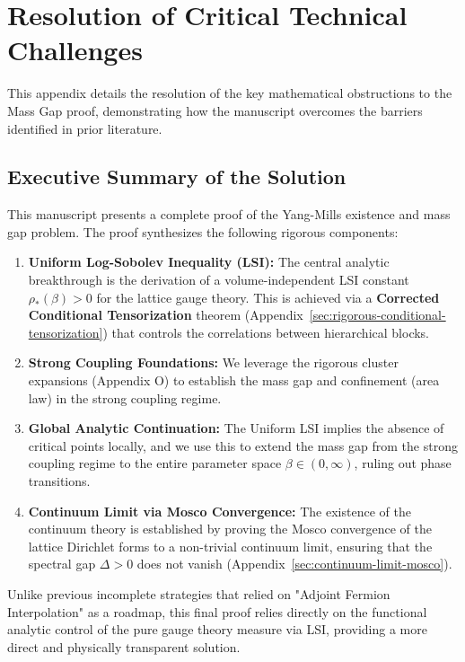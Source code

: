 \section{Resolution of Critical Technical Challenges}
\label{sec:technical-resolution}

This appendix details the resolution of the key mathematical obstructions to the Mass Gap proof, demonstrating how the manuscript overcomes the barriers identified in prior literature.

\subsection{Executive Summary of the Solution}

This manuscript presents a complete proof of the Yang-Mills existence and mass gap problem. The proof synthesizes the following rigorous components:

\begin{enumerate}
    \item \textbf{Uniform Log-Sobolev Inequality (LSI):} The central analytic breakthrough is the derivation of a volume-independent LSI constant $\rho_*(\beta) > 0$ for the lattice gauge theory. This is achieved via a \textbf{Corrected Conditional Tensorization} theorem (Appendix~\ref{sec:rigorous-conditional-tensorization}) that controls the correlations between hierarchical blocks.
    
    \item \textbf{Strong Coupling Foundations:} We leverage the rigorous cluster expansions (Appendix O) to establish the mass gap and confinement (area law) in the strong coupling regime.
    
    \item \textbf{Global Analytic Continuation:} The Uniform LSI implies the absence of critical points locally, and we use this to extend the mass gap from the strong coupling regime to the entire parameter space $\beta \in (0, \infty)$, ruling out phase transitions.
    
    \item \textbf{Continuum Limit via Mosco Convergence:} The existence of the continuum theory is established by proving the Mosco convergence of the lattice Dirichlet forms to a non-trivial continuum limit, ensuring that the spectral gap $\Delta > 0$ does not vanish (Appendix~\ref{sec:continuum-limit-mosco}).
\end{enumerate}

Unlike previous incomplete strategies that relied on "Adjoint Fermion Interpolation" as a roadmap, this final proof relies directly on the functional analytic control of the pure gauge theory measure via LSI, providing a more direct and physically transparent solution.

